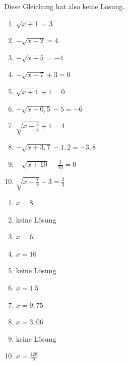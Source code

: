 \begin{minipage}{\textwidth}
\end{minipage}
\textcolor{loes}{Diese Gleichung hat also keine Lösung.}
\newpage
\begin{Exercise}[title={Löse folgende Gleichungen.}, label=wurzelgleichungenA1]
	\begin{enumerate}[label=\alph*)]
		\item \(\sqrt{x+1}=3\)
		\item \(-\sqrt{x-2}=4\)
		\item \(-\sqrt{x-5}=-1\)
		\item \(-\sqrt{x-7}+3=0\)
		\item \(\sqrt{x+4}+1=0\)
		\item \(-\sqrt{x-0,5}-5=-6\)
		\item \(\sqrt{x-\frac{3}{4}}+1=4\)
		\item \(-\sqrt{x+3,7}-1,2=-3,8\)
		\item \(-\sqrt{x+10}-\frac{3}{10}=0\)
		\item \(\sqrt{x-\frac{7}{9}}-3=\frac{2}{3}\)
	\end{enumerate}
\end{Exercise}
\begin{Answer}[ref=wurzelgleichungenA1]
	\begin{enumerate}[label=\alph*)]
		\item \(x=8\)
		\item keine Lösung
		\item \(x=6\)
		\item \(x=16\)
		\item keine Lösung
		\item \(x=1.5\)
		\item \(x=9,75\)
		\item \(x=3,06\)
		\item keine Lösung
		\item \(x=\frac{128}{9}\)
	\end{enumerate}
\end{Answer}

